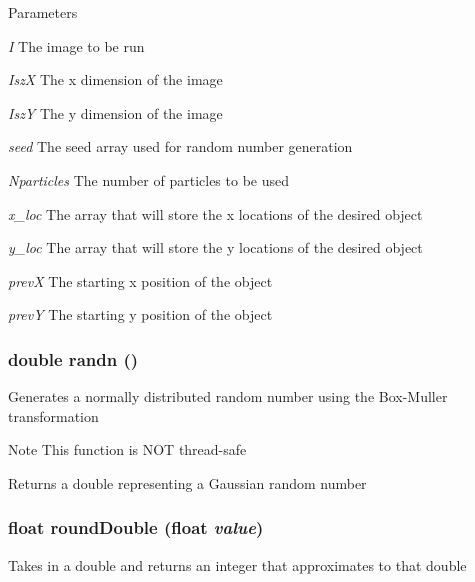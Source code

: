 \begin{DoxyParams}{Parameters}
\item[{\em I}]The image to be run \item[{\em IszX}]The x dimension of the image \item[{\em IszY}]The y dimension of the image \item[{\em seed}]The seed array used for random number generation \item[{\em Nparticles}]The number of particles to be used \item[{\em x\_\-loc}]The array that will store the x locations of the desired object \item[{\em y\_\-loc}]The array that will store the y locations of the desired object \item[{\em prevX}]The starting x position of the object \item[{\em prevY}]The starting y position of the object \end{DoxyParams}
\hypertarget{ex__particle__CUDA__float_8cu_a03915aa2531cec7b68e3461c62968b90}{
\subsubsection[{randn}]{\setlength{\rightskip}{0pt plus 5cm}double randn ()}}
\label{ex__particle__CUDA__float_8cu_a03915aa2531cec7b68e3461c62968b90}
Generates a normally distributed random number using the Box-\/Muller transformation \begin{DoxyNote}{Note}
This function is NOT thread-\/safe 
\end{DoxyNote}
\begin{DoxyReturn}{Returns}
a double representing a Gaussian random number 
\end{DoxyReturn}
\hypertarget{ex__particle__CUDA__float_8cu_ae00aa7d5a2f9777fb0184ea60fd0d484}{
\subsubsection[{roundDouble}]{\setlength{\rightskip}{0pt plus 5cm}float roundDouble (float {\em value})}}
\label{ex__particle__CUDA__float_8cu_ae00aa7d5a2f9777fb0184ea60fd0d484}
Takes in a double and returns an integer that approximates to that double

